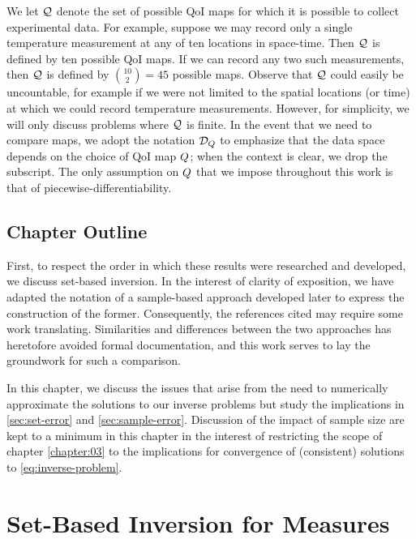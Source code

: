 We let $\mathcal{Q}$ denote the set of possible QoI maps for which it is possible to collect experimental data.
For example, suppose we may record only a single temperature measurement at any of ten locations in space-time.
Then $\mathcal{Q}$ is defined by ten possible QoI maps.
If we can record any two such measurements, then $\mathcal{Q}$ is defined by $\binom{10}{2} = 45$ possible maps.
Observe that $\mathcal{Q}$ could easily be uncountable, for example if we were not limited to the spatial locations (or time) at which we could record temperature measurements.
However, for simplicity, we will only discuss problems where $\mathcal{Q}$ is finite.
In the event that we need to compare maps, we adopt the notation $\mathcal{D}_{Q}$ to emphasize that the data space depends on the choice of QoI map $Q$; when the context is clear, we drop the subscript.
The only assumption on $Q$ that we impose throughout this work is that of piecewise-differentiability.

\subsection{Chapter Outline}
First, to respect the order in which these results were researched and developed, we discuss set-based inversion.
In the interest of clarity of exposition, we have adapted the notation of a sample-based approach developed later to express the construction of the former.
Consequently, the references cited may require some work translating. Similarities and differences between the two approaches has heretofore avoided formal documentation, and this work serves to lay the groundwork for such a comparison.

In this chapter, we discuss the issues that arise from the need to numerically approximate the solutions to our inverse problems but study the implications in \ref{sec:set-error} and \ref{sec:sample-error}.
Discussion of the impact of sample size are kept to a minimum in this chapter in the interest of restricting the scope of chapter \ref{chapter:03} to the implications for convergence of (consistent) solutions to \eqref{eq:inverse-problem}.

\section{Set-Based Inversion for Measures}\label{sec:ch02-set}





\FloatBarrier


